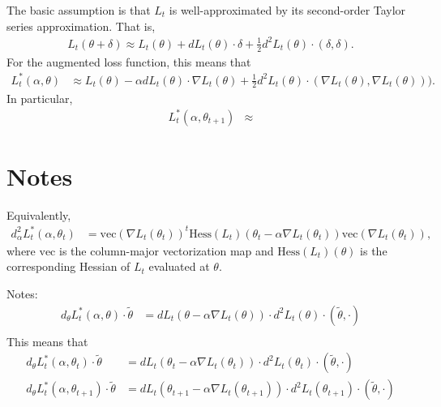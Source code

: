 \documentclass{article}
\newcommand{\Hess}{\mathrm{Hess}}
\newcommand{\rmvec}{\mathrm{vec}}
\begin{document}
The basic assumption is that $L_t$ is well-approximated
by its second-order Taylor series approximation.  That is,
\begin{align*}
    L_t (\theta + \delta) \approx
    L_t(\theta)  + dL_t(\theta) \cdot \delta + \frac{1}{2} d^2 L_t(\theta) \cdot (\delta, \delta).
\end{align*}
For the augmented loss function, this means that
\begin{align*}
    L_t^* (\alpha, \theta)
    &\approx L_t(\theta) - \alpha dL_t(\theta) \cdot \nabla L_t(\theta)
    + \frac{1}{2} d^2 L_t(\theta) \cdot (\nabla L_t(\theta), \nabla L_t(\theta))).
\end{align*}
In particular,
\begin{align*}
    L_t^* (\alpha, \theta_{t+1})
    &\approx
\end{align*}

\section{Notes}

Equivalently,
\begin{align*}
    d^2_\alpha L_t^* (\alpha, \theta_t)
    &= \rmvec(\nabla L_t(\theta_t))^t \Hess(L_t)(\theta_t - \alpha \nabla L_t (\theta_t)) \rmvec(\nabla L_t(\theta_t)),
\end{align*}
where $\rmvec$ is the column-major vectorization map and $\Hess(L_t)(\theta)$ is the
corresponding Hessian of $L_t$ evaluated at $\theta$.


Notes:
\begin{align*}
    d_\theta L_t^* (\alpha, \theta) \cdot \tilde{\theta}
    &= dL_t(\theta - \alpha \nabla L_t (\theta)) \cdot d^2 L_t(\theta) \cdot (\tilde{\theta}, \cdot) \\
\end{align*}
This means that
\begin{align*}
    d_\theta L_t^* (\alpha, \theta_t) \cdot \tilde{\theta}
    &= dL_t(\theta_t - \alpha \nabla L_t (\theta_t)) \cdot d^2 L_t(\theta_t) \cdot (\tilde{\theta}, \cdot) \\
    d_\theta L_t^* (\alpha, \theta_{t+1}) \cdot \tilde{\theta}
    &= dL_t(\theta_{t+1} - \alpha \nabla L_t (\theta_{t+1})) \cdot d^2 L_t(\theta_{t+1}) \cdot (\tilde{\theta}, \cdot) \\
\end{align*}



\end{document}
